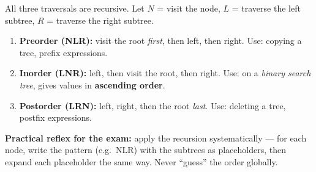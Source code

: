 \documentclass[11pt]{article}
\newcommand{\cle}[1]{{\popxbold\color{popdark}#1}}
\begin{document}
\begin{methode}
All three traversals are \cle{recursive}. Let $N$ = visit the node, $L$ = traverse the left subtree, $R$ = traverse the right subtree.
\begin{enumerate}
\item \textbf{Preorder (NLR):} visit the root \emph{first}, then left, then right. Use: copying a tree, prefix expressions.
\item \textbf{Inorder (LNR):} left, then visit the root, then right. Use: on a \emph{binary search tree}, gives values in \textbf{ascending order}.
\item \textbf{Postorder (LRN):} left, right, then the root \emph{last}. Use: deleting a tree, postfix expressions.
\end{enumerate}
\textbf{Practical reflex for the exam:} apply the recursion systematically — for each node, write the pattern (e.g.\ NLR) with the subtrees as placeholders, then expand each placeholder the same way. Never ``guess'' the order globally.
\end{methode}
\end{document}
